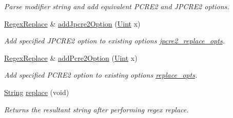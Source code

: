 \begin{DoxyCompactItemize}
\begin{DoxyCompactList}\small\item\em Parse modifier string and add equivalent P\+C\+R\+E2 and J\+P\+C\+R\+E2 options. \end{DoxyCompactList}\item 
\hyperlink{classjpcre2_1_1RegexReplace}{Regex\+Replace} \& \hyperlink{classjpcre2_1_1RegexReplace_a3f86b1e11d08d0153a08244771e59061}{add\+Jpcre2\+Option} (\hyperlink{namespacejpcre2_a078242d38221a13fb3543b9edd78c099}{Uint} x)
\begin{DoxyCompactList}\small\item\em Add specified J\+P\+C\+R\+E2 option to existing options \hyperlink{classjpcre2_1_1RegexReplace_acf13bcb16918df4b7bcaa7e49a1c7d59}{jpcre2\+\_\+replace\+\_\+opts}. \end{DoxyCompactList}\item 
\hyperlink{classjpcre2_1_1RegexReplace}{Regex\+Replace} \& \hyperlink{classjpcre2_1_1RegexReplace_a3cfd03568b23bebcbb530a2c120b5d33}{add\+Pcre2\+Option} (\hyperlink{namespacejpcre2_a078242d38221a13fb3543b9edd78c099}{Uint} x)
\begin{DoxyCompactList}\small\item\em Add specified P\+C\+R\+E2 option to existing options \hyperlink{classjpcre2_1_1RegexReplace_afc79699cfcad8b7cbb26864b6b67cdc7}{replace\+\_\+opts}. \end{DoxyCompactList}\item 
\hyperlink{namespacejpcre2_a91f03070152fb228bc116c5a737f1d16}{String} \hyperlink{classjpcre2_1_1RegexReplace_afd087fa7a9bfedec802d1a3dd7edbdd0}{replace} (void)
\begin{DoxyCompactList}\small\item\em Returns the resultant string after performing regex replace. \end{DoxyCompactList}\end{DoxyCompactItemize}
